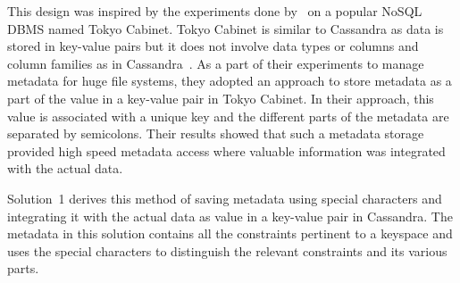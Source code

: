 This design was inspired by the experiments done by~\citet{Hackl} on a popular
\ac{NoSQL} \ac{DBMS} named Tokyo Cabinet.  Tokyo Cabinet is similar to Cassandra
as data is stored in key-value pairs but it does not involve data types or
columns and column families as in Cassandra~\citep{Hackl,tokyo}.
As a part of their experiments to manage metadata for huge file systems,  they
adopted an approach to store metadata  as a part of the value in a key-value
pair in Tokyo Cabinet.  In their approach, this value  is associated with a
unique key and the different parts of the metadata are separated by semicolons.
Their results showed that such a metadata storage provided high speed metadata
access where valuable information was integrated with the actual data.

Solution~1 derives this method of saving
metadata using special characters and integrating it with the actual data as
value in a key-value pair in Cassandra.  The metadata in this solution 
contains all the constraints pertinent to a keyspace and uses
the special characters to distinguish the relevant constraints and its various
parts.













